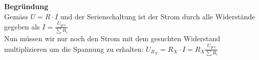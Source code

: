 											\begin{center}
											\end{center}
										\iend


										\textbf{Begründung} \\
											Gemäss $\displaystyle U = R \cdot I $ und der Serienschaltung ist der Strom durch alle Widerstände gegeben als $\displaystyle I = \frac{U_{ges}}{\sum R_i} $ \\
											Nun müssen wir nur noch den Strom mit dem gesuchten Widerstand multiplizieren um die Spannung zu erhalten: $\displaystyle U_{R_X} = R_X \cdot I = R_X \frac{U_{ges}}{\sum R_i} $

